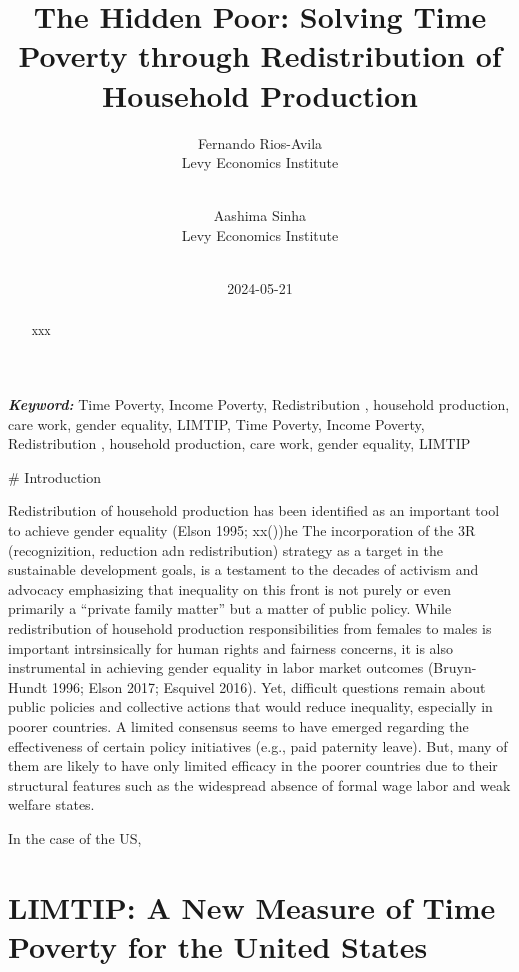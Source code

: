 \documentclass[
  11pt,
]{article}
\title{The Hidden Poor: Solving Time Poverty through Redistribution of
Household Production}
\author{
Fernando Rios-Avila\\
Levy Economics Institute\\
\\
\and 
Aashima Sinha\\
Levy Economics Institute\\
\\
}
\date{2024-05-21}
\begin{document}
\def\spacingset#1{\renewcommand{\baselinestretch}%
{#1}\small\normalsize} \spacingset{1}


\maketitle
\begin{abstract}
xxx
\end{abstract}
 
\vspace{.2in}

\textbf{\textit{Keyword: }}
    Time Poverty, Income Poverty, Redistribution , household production,
care work, gender equality, LIMTIP, 
    Time Poverty, Income Poverty, Redistribution , household production,
care work, gender equality, LIMTIP 


\thispagestyle{empty}
\clearpage{}
\newpage
\spacingset{1.2} %
\# Introduction

Redistribution of household production has been identified as an
important tool to achieve gender equality (Elson 1995; xx())he The
incorporation of the 3R (recognizition, reduction adn redistribution)
strategy as a target in the sustainable development goals, is a
testament to the decades of activism and advocacy emphasizing that
inequality on this front is not purely or even primarily a ``private
family matter'' but a matter of public policy. While redistribution of
household production responsibilities from females to males is important
intrsinsically for human rights and fairness concerns, it is also
instrumental in achieving gender equality in labor market outcomes
(Bruyn-Hundt 1996; Elson 2017; Esquivel 2016). Yet, difficult questions
remain about public policies and collective actions that would reduce
inequality, especially in poorer countries. A limited consensus seems to
have emerged regarding the effectiveness of certain policy initiatives
(e.g., paid paternity leave). But, many of them are likely to have only
limited efficacy in the poorer countries due to their structural
features such as the widespread absence of formal wage labor and weak
welfare states.

In the case of the US,

\section{LIMTIP: A New Measure of Time Poverty for the United
States}\label{limtip-a-new-measure-of-time-poverty-for-the-united-states}
\end{document}
